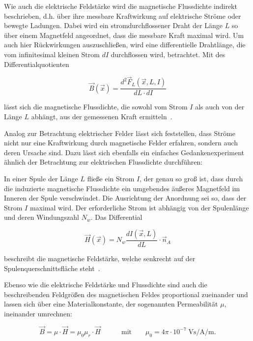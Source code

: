 Wie auch die elektrische Feldstärke wird die magnetische Flussdichte indirekt beschrieben, d.h. über ihre messbare Kraftwirkung auf elektrische Ströme oder bewegte Ladungen. Dabei wird ein stromdurchflossener Draht der Länge $L$ so über einem Magnetfeld angeordnet, dass die messbare Kraft maximal wird. Um auch hier Rückwirkungen auszuschließen, wird eine differentielle Drahtlänge, die vom infinitesimal kleinen Strom $dI$ durchflossen wird, betrachtet. Mit des Differentialquotienten

\begin{equation}
    \vec B(\vec x) = \frac{d^2 \vec F_L(\vec x,L,I)}{dL \cdot dI}
\end{equation}

lässt sich die magnetische Flussdichte, die sowohl vom Strom $I$ als auch von der Länge $L$ abhängt, aus der gemessenen Kraft ermitteln~\cite{EM_Schirmung}. 
\par
\vspace{\linespace}
Analog zur Betrachtung elektrischer Felder lässt sich feststellen, dass Ströme nicht nur eine Kraftwirkung durch magnetische Felder erfahren, sondern auch deren Ursache sind. Dazu lässt sich ebenfalls ein einfaches Gedankenexperiment ähnlich der Betrachtung zur elektrischen Flussdichte durchführen: 
\par
\vspace{\linespace}
In einer Spule der Länge $L$ fließe ein Strom $I$, der genau so groß ist, dass durch die induzierte magnetische Flussdichte ein umgebendes äußeres Magnetfeld im Inneren der Spule verschwindet. Die Ausrichtung der Anordnung sei so, dass der Strom $I$ maximal wird. Der erforderliche Strom ist abhängig von der Spulenlänge und deren Windungszahl $N_w$. Das Differential

\begin{equation}
    \vec H(\vec x) = N_w \frac{dI(\vec x,L)}{dL} \cdot \vec n_A
\end{equation}

beschreibt die magnetische Feldstärke, welche senkrecht auf der Spulenquerschnittsfläche steht~\cite{EM_Schirmung}. 
\par
\vspace{\linespace}
Ebenso wie die elektrische Feldstärke und Flussdichte sind auch die beschreibenden Feldgrößen des \mbox{magnetischen} Feldes proportional zueinander und lassen sich über eine Materialkonstante, der sogenannten Permeabilität $\mu$, ineinander umrechnen:

\begin{equation}
    \vec B = \mu \cdot \vec H = \mu_0 \mu_r \cdot \vec H \qquad \quad \text{mit} \qquad \mu_0 = 4 \pi \cdot 10^{-7} \; \si{\volt\second\per\ampere\per\meter}.
    \label{eq:2_Materialgleichung_magnetisches_Feld}
\end{equation}

